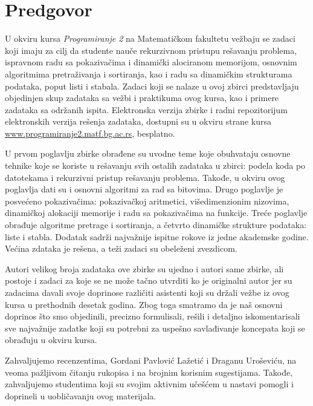 
\chapter*{Predgovor}

U okviru kursa {\em Programiranje 2} na Matematičkom fakultetu vežbaju se zadaci 
koji imaju za cilj da studente nauče rekurzivnom pristupu rešavanju problema, 
ispravnom radu sa pokazivačima i dinamički alociranom memorijom, osnovnim algoritmima 
pretraživanja i sortiranja, kao i radu sa dinamičkim strukturama podataka, 
poput listi i stabala. Zadaci koji se nalaze u ovoj zbirci predstavljaju 
objedinjen skup zadataka sa vežbi i praktikuma ovog kursa, kao i primere 
zadataka sa održanih ispita. 
Elektronska verzija zbirke i radni repozitorijum elektronskih verzija rešenja zadataka, dostupni su 
u okviru strane kursa \url{www.programiranje2.matf.bg.ac.rs}, besplatno.


U prvom poglavlju zbirke obrađene su uvodne teme koje obuhvataju osnovne tehnike koje se koriste u rešavanju svih ostalih zadataka u zbirci: podela koda po datotekama i rekurzivni pristup rešavanju problema. Takođe, u okviru ovog poglavlja dati su i osnovni algoritmi za rad sa bitovima. Drugo poglavlje je posvećeno pokazivačima: pokazivačkoj aritmetici, višedimenzionim nizovima, dinamičkoj alokaciji memorije i radu sa pokazivačima na funkcije. Treće poglavlje obrađuje algoritme pretrage i sortiranja, a četvrto dinamičke strukture podataka: liste i stabla. Dodatak sadrži najvažnije ispitne rokove iz jedne akademske godine. Većina zdataka je rešena, a teži zadaci su obeleženi zvezdicom.


Autori velikog broja zadataka ove zbirke su ujedno i autori same zbirke, ali postoje 
i zadaci za koje se ne može tačno utvrditi ko je originalni autor jer su zadacima 
davali svoje doprinose različiti asistenti koji su držali vežbe iz ovog kursa u 
prethodnih desetak godina. Zbog toga smatramo da je naš osnovni doprinos 
što smo objedinili, precizno formulisali, rešili i detaljno iskomentarisali 
sve najvažnije zadatke koji su potrebni za uspešno savlađivanje koncepata 
koji se obrađuju u okviru kursa. 

\newpage
Zahvaljujemo recenzentima, Gordani Pavlović Lažetić i Draganu Uroševiću, na veoma pažljivom čitanju rukopisa i na brojnim korisnim sugestijama. Takođe, zahvaljujemo studentima koji su svojim aktivnim učešćem u nastavi pomogli i doprineli u uobličavanju ovog materijala. 

